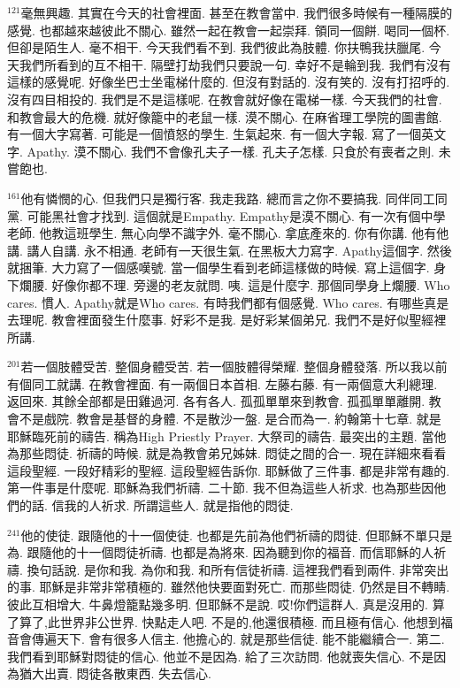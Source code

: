 \documentclass{book}
\begin{document}
$^{121}$毫無興趣.
其實在今天的社會裡面.
甚至在教會當中.
我們很多時候有一種隔膜的感覺.
也都越來越彼此不關心.
雖然一起在教會一起崇拜.
領同一個餅.
喝同一個杯.
但卻是陌生人.
毫不相干.
今天我們看不到.
我們彼此為肢體.
你扶鴨我扶臘尾.
今天我們所看到的互不相干.
隔壁打劫我們只要說一句.
幸好不是輪到我.
我們有沒有這樣的感覺呢.
好像坐巴士坐電梯什麼的.
但沒有對話的.
沒有笑的.
沒有打招呼的.
沒有四目相投的.
我們是不是這樣呢.
在教會就好像在電梯一樣.
今天我們的社會.
和教會最大的危機.
就好像籠中的老鼠一樣.
漠不關心.
在麻省理工學院的圖書館.
有一個大字寫著.
可能是一個憤怒的學生.
生氣起來.
有一個大字報.
寫了一個英文字.
Apathy.
漠不關心.
我們不會像孔夫子一樣.
孔夫子怎樣.
只食於有喪者之則.
未嘗飽也.

$^{161}$他有憐憫的心.
但我們只是獨行客.
我走我路.
總而言之你不要搞我.
同伴同工同黨.
可能黑社會才找到.
這個就是Empathy.
Empathy是漠不關心.
有一次有個中學老師.
他教這班學生.
無心向學不識字外.
毫不關心.
拿底產來的.
你有你講.
他有他講.
講人自講.
永不相通.
老師有一天很生氣.
在黑板大力寫字.
Apathy這個字.
然後就捆筆.
大力寫了一個感嘆號.
當一個學生看到老師這樣做的時候.
寫上這個字.
身下爛腰.
好像你都不理.
旁邊的老友就問.
咦.
這是什麼字.
那個同學身上爛腰.
Who cares.
慣人.
Apathy就是Who cares.
有時我們都有個感覺.
Who cares.
有哪些真是去理呢.
教會裡面發生什麼事.
好彩不是我.
是好彩某個弟兄.
我們不是好似聖經裡所講.

$^{201}$若一個肢體受苦.
整個身體受苦.
若一個肢體得榮耀.
整個身體發落.
所以我以前有個同工就講.
在教會裡面.
有一兩個日本首相.
左藤右藤.
有一兩個意大利總理.
返回來.
其餘全部都是田雞過河.
各有各人.
孤孤單單來到教會.
孤孤單單離開.
教會不是戲院.
教會是基督的身體.
不是散沙一盤.
是合而為一.
約翰第十七章.
就是耶穌臨死前的禱告.
稱為High Priestly Prayer.
大祭司的禱告.
最突出的主題.
當他為那些悶徒.
祈禱的時候.
就是為教會弟兄姊妹.
悶徒之間的合一.
現在詳細來看看這段聖經.
一段好精彩的聖經.
這段聖經告訴你.
耶穌做了三件事.
都是非常有趣的.
第一件事是什麼呢.
耶穌為我們祈禱.
二十節.
我不但為這些人祈求.
也為那些因他們的話.
信我的人祈求.
所謂這些人.
就是指他的悶徒.

$^{241}$他的使徒.
跟隨他的十一個使徒.
也都是先前為他們祈禱的悶徒.
但耶穌不單只是為.
跟隨他的十一個悶徒祈禱.
也都是為將來.
因為聽到你的福音.
而信耶穌的人祈禱.
換句話說.
是你和我.
為你和我.
和所有信徒祈禱.
這裡我們看到兩件.
非常突出的事.
耶穌是非常非常積極的.
雖然他快要面對死亡.
而那些悶徒.
仍然是目不轉睛.
彼此互相增大.
牛鼻燈籠點幾多明.
但耶穌不是說.
哎!你們這群人.
真是沒用的.
算了算了,此世界非公世界.
快點走人吧.
不是的,他還很積極.
而且極有信心.
他想到福音會傳遍天下.
會有很多人信主.
他擔心的.
就是那些信徒.
能不能繼續合一.
第二.
我們看到耶穌對悶徒的信心.
他並不是因為.
給了三次訪問.
他就喪失信心.
不是因為猶大出賣.
悶徒各散東西.
失去信心.
\end{document}
